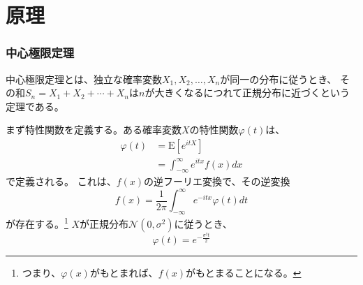 \documentclass[../../../main]{subfiles}
\begin{document}
\section{原理}



\clearpage


\subsubsection{中心極限定理}
中心極限定理とは、独立な確率変数$X_1, X_2, \ldots, X_n$が同一の分布に従うとき、
その和$S_n = X_1 + X_2 + \cdots + X_n$は$n$が大きくなるにつれて正規分布に近づくという定理である。

まず特性関数を定義する。ある確率変数$X$の特性関数$\varphi(t)$は、
\begin{equation}
    \begin{split}
        \varphi(t) & = \mathrm{E}[e^{itX}]                     \\
                   & = \int_{-\infty}^{\infty} e^{itx} f(x) dx
    \end{split}
\end{equation}
で定義される。
これは、$f(x)$の逆フーリエ変換で、その逆変換
\begin{equation}
    f(x) = \frac{1}{2\pi} \int_{-\infty}^{\infty} e^{-itx} \varphi(t) dt
\end{equation}
が存在する。\footnote{
    つまり、$\varphi(x)$がもとまれば、$f(x)$がもとまることになる。
}
$X$が正規分布$\mathcal{N}(0, \sigma^2)$に従うとき、
\begin{equation}\label{eq:standard-normal-characteristic-function}
    \varphi(t) = e^{-\frac{\sigma^2t}{2}}
\end{equation}
\end{document}

